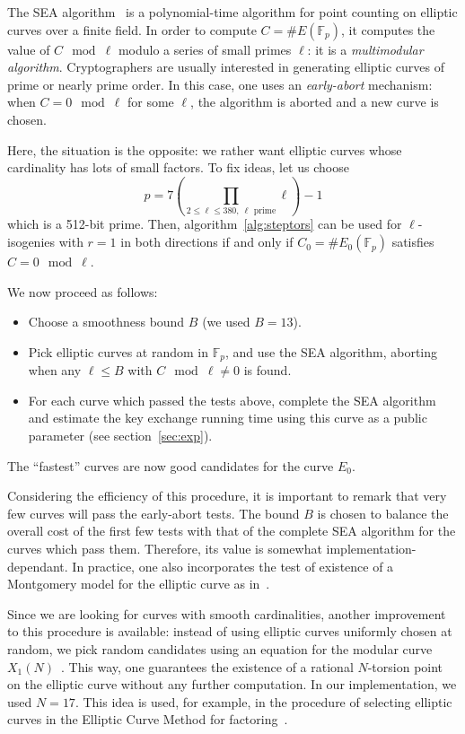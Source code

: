 \documentclass{article}
\newcommand{\F}{\mathbb{F}}
\theoremstyle{definition}
\begin{document}
The SEA algorithm~\cite{schoof95,todo} is a polynomial-time algorithm for
point counting on elliptic curves over a finite field. In order to compute
$C = \# E(\F_p)$, it computes the value of $C\mod\ell$ modulo a series
of small primes $\ell$: it is a \emph{multimodular algorithm}.
Cryptographers are usually interested in generating elliptic curves of
prime or nearly prime order. In this case, one uses an \emph{early-abort}
mechanism: when $C = 0\mod\ell$ for some $\ell$, the algorithm is aborted
and a new curve is chosen.

Here, the situation is the opposite: we rather want elliptic curves
whose cardinality has lots of small factors. To fix ideas, let us choose
\[
p = 7 \left(\prod_{2\leq\ell\leq 380,\ \ell \text{ prime}} \ell\right) - 1
\]
which is a 512-bit prime. Then, algorithm~\ref{alg:steptors} can be used
for $\ell$-isogenies with $r=1$ in both directions if and only if
$C_0 = \# E_0(\F_p)$ satisfies $C=0\mod\ell$.

We now proceed as follows:
\begin{itemize}
\item Choose a smoothness bound $B$ (we used $B = 13$).
\item Pick elliptic curves at random in $\F_p$, and use the SEA
algorithm, aborting when any $\ell\leq B$ with $C\mod\ell\neq 0$
is found.
\item For each curve which passed the tests above, complete the SEA
algorithm and estimate the key exchange running time using this
curve as a public parameter (see section~\ref{sec:exp}).
\end{itemize}
The ``fastest'' curves are now good candidates for the curve $E_0$.

Considering the efficiency of this procedure, it is important to remark
that very few curves will pass the early-abort tests. The bound $B$ is
chosen to balance the overall cost of the first few tests with that of
the complete SEA algorithm for the curves which pass them. Therefore,
its value is somewhat implementation-dependant. In practice, one also
incorporates the test of existence of a Montgomery model for the
elliptic curve as in~\cite{todo:refMontgomery}.

Since we are looking for curves with smooth cardinalities, another
improvement to this procedure is available: instead of using elliptic
curves uniformly chosen at random, we pick random candidates using
an equation for the modular curve $X_1(N)$~\cite{sutherland2012constructing}.
This way, one guarantees the existence of a rational $N$-torsion point
on the elliptic curve without any further computation. In our
implementation, we used $N = 17$. This idea is used, for example,
in the procedure of selecting elliptic curves in the Elliptic Curve Method
for factoring~\cite{todo:refECM}.
\end{document}
